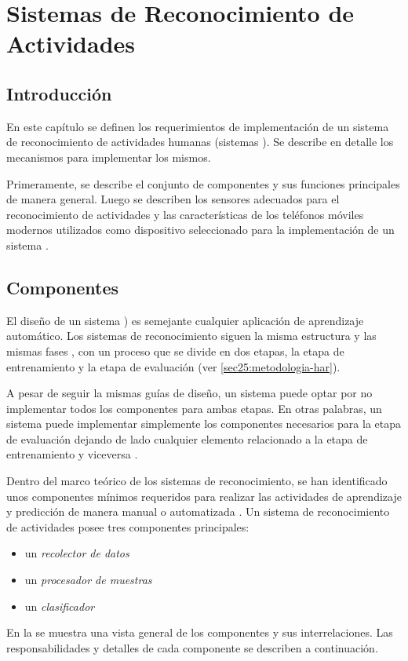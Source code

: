 
\chapter{Sistemas de Reconocimiento de Actividades }

\label{chap4:sistemas-de-reconocimiento}

\section{Introducción}

\label{sec21:introduccion}

En este capítulo se definen los requerimientos de implementación de
un sistema de reconocimiento de actividades humanas (sistemas ).
Se describe en detalle los mecanismos para implementar los mismos. 

Primeramente, se describe el conjunto de componentes y sus funciones
principales de manera general. Luego se describen los sensores adecuados
para el reconocimiento de actividades y las características de los
teléfonos móviles modernos utilizados como dispositivo seleccionado
para la implementación de un sistema .

\section{Componentes}

El diseño de un sistema ) es semejante cualquier aplicación
de aprendizaje automático. Los sistemas de reconocimiento siguen la
misma estructura y las mismas fases \cite{LaraLabrador2013}, con
un proceso que se divide en dos etapas, la etapa de entrenamiento
y la etapa de evaluación (ver \ref{sec25:metodologia-har}). 

A pesar de seguir la mismas guías de diseño, un sistema puede optar
por no implementar todos los componentes para ambas etapas. En otras
palabras, un sistema puede implementar simplemente los componentes
necesarios para la etapa de evaluación dejando de lado cualquier elemento
relacionado a la etapa de entrenamiento y viceversa . 

Dentro del marco teórico de los sistemas de reconocimiento, se han
identificado unos componentes mínimos requeridos para realizar las
actividades de aprendizaje y predicción de manera manual o automatizada
\cite{Choudhury2008}. Un sistema de reconocimiento de actividades
posee tres componentes principales:
\begin{itemize}
\item un \emph{recolector de datos}
\item un\emph{ procesador de muestras} 
\item un \emph{clasificador }
\end{itemize}
En la  se muestra una vista general
de los componentes y sus interrelaciones. Las responsabilidades y
detalles de cada componente se describen a continuación. 

